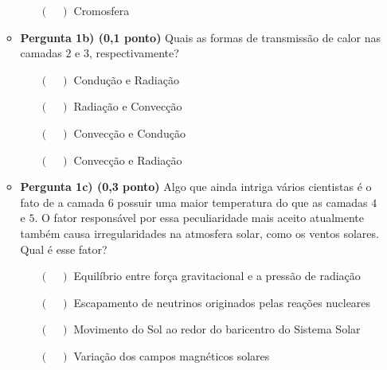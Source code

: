 \documentclass[a4paper, 12pt]{article}
\begin{document}
\begin{flushleft}
\begin{itemize}
\begin{itemize}
\begin{multicols}{2}
\begin{itemize}
						\item[$(\quad)$] Cromosfera
					\end{itemize} \end{multicols}
				\item \textbf{Pergunta 1b) (0,1 ponto)} Quais as formas de transmissão de calor nas camadas $2$ e $3$, respectivamente?
					\begin{itemize}
						\item[$(\quad)$] Condução e Radiação
						\item[$(\quad)$] Radiação e Convecção
						\item[$(\quad)$] Convecção e Condução
						\item[$(\quad)$] Convecção e Radiação
					\end{itemize}
				\item \textbf{Pergunta 1c) (0,3 ponto)} Algo que ainda intriga vários cientistas é o fato de a camada $6$ possuir uma maior temperatura do que as camadas $4$ e $5$. O fator responsável por essa peculiaridade mais aceito atualmente também causa irregularidades na atmosfera solar, como os ventos solares. Qual é esse fator?
					\begin{itemize}
						\item[$(\quad)$] Equilíbrio entre força gravitacional e a pressão de radiação
						\item[$(\quad)$] Escapamento de neutrinos originados pelas reações nucleares
						\item[$(\quad)$] Movimento do Sol ao redor do baricentro do Sistema Solar
						\item[$(\quad)$] Variação dos campos magnéticos solares
					\end{itemize}
			\end{itemize}
			

\end{itemize}
\end{flushleft}
\end{document}
